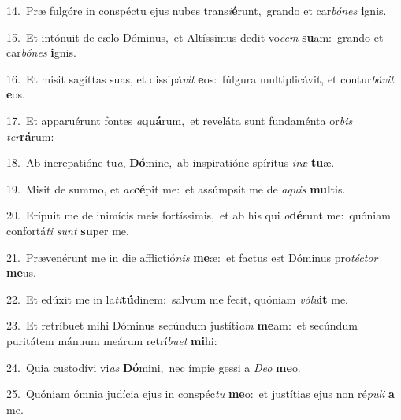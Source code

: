 {\numbfont\textcolor{\numbcolor}{14.}}~Præ fulgóre in conspéctu ejus nubes trans\-\textit{i}\-\textbf{é}runt,~\star grando et car\-\textit{bó}\-\textit{nes} \textbf{i}\-gnis.\par
{\numbfont\textcolor{\numbcolor}{15.}}~Et intónuit de cælo Dóminus,~\dagger et Altíssimus dedit vo\textit{cem} \textbf{su}\-am:~\star grando et car\-\textit{bó}\-\textit{nes} \textbf{i}\-gnis.\par
{\numbfont\textcolor{\numbcolor}{16.}}~Et misit sagíttas suas, et dissipá\textit{vit} \textbf{e}\-os:~\star fúlgura multiplicávit, et contur\-\textit{bá}\-\textit{vit} \textbf{e}\-os.\par
{\numbfont\textcolor{\numbcolor}{17.}}~Et apparuérunt fontes \textit{a}\-\textbf{quá}rum,~\star et reveláta sunt fundaménta or\textit{bis} \textit{ter}\-\textbf{rá}rum:\par
{\numbfont\textcolor{\numbcolor}{18.}}~Ab increpatióne tu\-\textit{a}\-, \textbf{Dó}\-mine,~\star ab inspiratióne spíritus \textit{i}\-\textit{ræ} \textbf{tu}\-æ.\par
{\numbfont\textcolor{\numbcolor}{19.}}~Misit de summo, et \textit{ac}\-\textbf{cé}pit me:~\star et assúmpsit me de \textit{a}\-\textit{quis} \textbf{mul}\-tis.\par
{\numbfont\textcolor{\numbcolor}{20.}}~Erípuit me de inimícis meis fortíssimis,~\dagger et ab his qui \textit{o}\-\textbf{dé}runt me:~\star quóniam confortá\textit{ti} \textit{sunt} \textbf{su}\-per me.\par
{\numbfont\textcolor{\numbcolor}{21.}}~Prævenérunt me in die afflictió\textit{nis} \textbf{me}\-æ:~\star et factus est Dóminus pro\-\textit{téc}\-\textit{tor} \textbf{me}\-us.\par
{\numbfont\textcolor{\numbcolor}{22.}}~Et edúxit me in la\-\textit{ti}\-\textbf{tú}dinem:~\star salvum me fecit, quóniam \textit{vó}\-\textit{lu}\textbf{it} me.\par
{\numbfont\textcolor{\numbcolor}{23.}}~Et retríbuet mihi Dóminus secúndum justíti\textit{am} \textbf{me}\-am:~\star et secúndum puritátem mánuum meárum retrí\-\textit{bu}\-\textit{et} \textbf{mi}\-hi:\par
{\numbfont\textcolor{\numbcolor}{24.}}~Quia custodívi vi\textit{as} \textbf{Dó}\-mini,~\star nec ímpie gessi a \textit{De}\-\textit{o} \textbf{me}\-o.\par
{\numbfont\textcolor{\numbcolor}{25.}}~Quóniam ómnia judícia ejus in conspéc\textit{tu} \textbf{me}\-o:~\star et justítias ejus non ré\-\textit{pu}\-\textit{li} \textbf{a} me.\par
